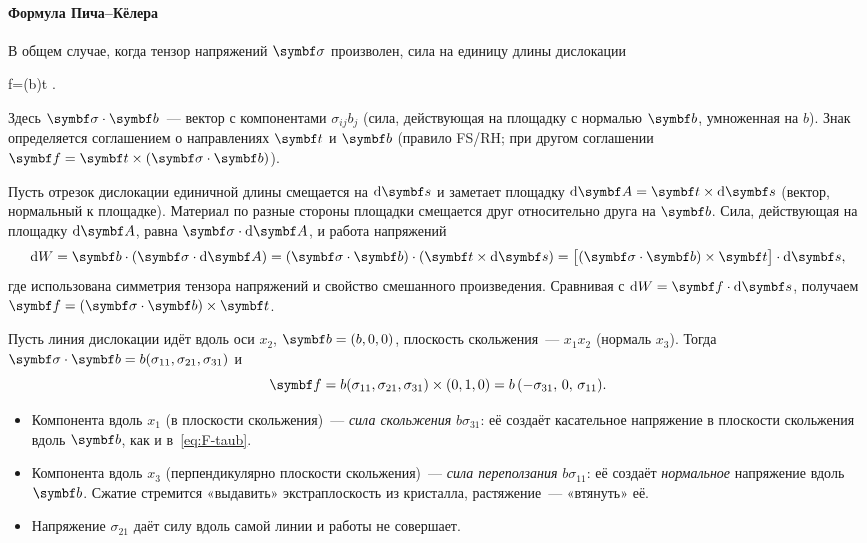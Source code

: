 \paragraph{Формула Пича--Кёлера}
В общем случае, когда тензор напряжений $\tn\sigma$ произволен, сила на
единицу длины дислокации
\begin{keyeq}\label{eq:peach-koehler}
\vb f=(\tn\sigma\cdot\vb b)\times\vb t .
\end{keyeq}
Здесь $\tn\sigma\cdot\vb b$~— вектор с компонентами $\sigma_{ij}b_j$
(сила, действующая на площадку с нормалью $\vb b$, умноженная на $b$).
Знак определяется соглашением о направлениях $\vb t$ и $\vb b$ (правило
FS/RH; при другом соглашении $\vb f=\vb t\times(\tn\sigma\cdot\vb b)$).

\begin{podrobnee}
Пусть отрезок дислокации единичной длины смещается на $\d\vb s$ и заметает
площадку $\d\vb A=\vb t\times\d\vb s$ (вектор, нормальный к площадке).
Материал по разные стороны площадки смещается друг относительно друга на
$\vb b$. Сила, действующая на площадку $\d\vb A$, равна $\tn\sigma\cdot
\d\vb A$, и работа напряжений
\[
\d W=\vb b\cdot(\tn\sigma\cdot\d\vb A)=(\tn\sigma\cdot\vb b)\cdot(\vb t\times\d\vb s)
=\bigl[(\tn\sigma\cdot\vb b)\times\vb t\bigr]\cdot\d\vb s ,
\]
где использована симметрия тензора напряжений и свойство смешанного
произведения. Сравнивая с $\d W=\vb f\cdot\d\vb s$, получаем
$\vb f=(\tn\sigma\cdot\vb b)\times\vb t$.
\end{podrobnee}

\begin{primer}
Пусть линия дислокации идёт вдоль оси $x_2$, $\vb b=(b,0,0)$, плоскость
скольжения~— $x_1x_2$ (нормаль $x_3$). Тогда
$\tn\sigma\cdot\vb b=b(\sigma_{11},\sigma_{21},\sigma_{31})$ и
\[
\vb f=b(\sigma_{11},\sigma_{21},\sigma_{31})\times(0,1,0)=b\,(-\sigma_{31},\,0,\,\sigma_{11}).
\]
\begin{itemize}
\item Компонента вдоль $x_1$ (в плоскости скольжения)~— \emph{сила
скольжения} $b\sigma_{31}$: её создаёт касательное напряжение в
плоскости скольжения вдоль $\vb b$, как и в~\eqref{eq:F-taub}.
\item Компонента вдоль $x_3$ (перпендикулярно плоскости скольжения)~—
\emph{сила переползания} $b\sigma_{11}$: её создаёт \emph{нормальное}
напряжение вдоль $\vb b$. Сжатие стремится «выдавить» экстраплоскость
из кристалла, растяжение~— «втянуть» её.
\item Напряжение $\sigma_{21}$ даёт силу вдоль самой линии и работы не
совершает.
\end{itemize}
\end{primer}

